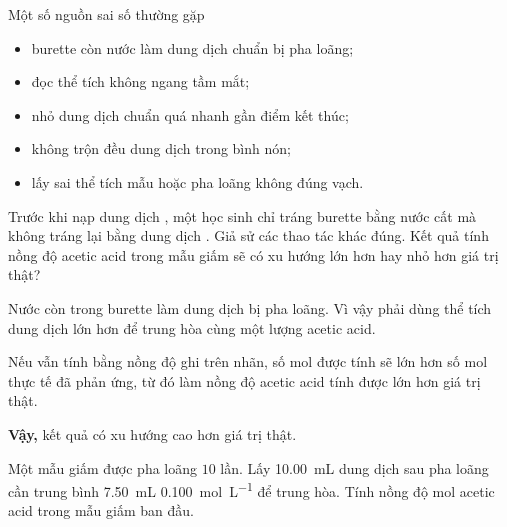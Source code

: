 \begin{ghinho}{Một số nguồn sai số thường gặp}
\begin{itemize}
\item burette còn nước làm dung dịch chuẩn bị pha loãng;
\item đọc thể tích không ngang tầm mắt;
\item nhỏ dung dịch chuẩn quá nhanh gần điểm kết thúc;
\item không trộn đều dung dịch trong bình nón;
\item lấy sai thể tích mẫu hoặc pha loãng không đúng vạch.
\end{itemize}
\end{ghinho}

\begin{vidu}
Trước khi nạp dung dịch , một học sinh chỉ tráng burette bằng nước cất mà không tráng lại bằng dung dịch . Giả sử các thao tác khác đúng. Kết quả tính nồng độ acetic acid trong mẫu giấm sẽ có xu hướng lớn hơn hay nhỏ hơn giá trị thật?
\end{vidu}
\begin{loigiai}
Nước còn trong burette làm dung dịch  bị pha loãng. Vì vậy phải dùng thể tích dung dịch lớn hơn để trung hòa cùng một lượng acetic acid.

Nếu vẫn tính bằng nồng độ  ghi trên nhãn, số mol  được tính sẽ lớn hơn số mol thực tế đã phản ứng, từ đó làm nồng độ acetic acid tính được lớn hơn giá trị thật.

\textbf{Vậy,} kết quả có xu hướng cao hơn giá trị thật.
\end{loigiai}

\begin{tuluyen}
Một mẫu giấm được pha loãng $10$ lần. Lấy \SI{10.00}{\milli\liter} dung dịch sau pha loãng cần trung bình \SI{7.50}{\milli\liter}  \SI{0.100}{\mole\per\liter} để trung hòa. Tính nồng độ mol acetic acid trong mẫu giấm ban đầu.
\end{tuluyen}

